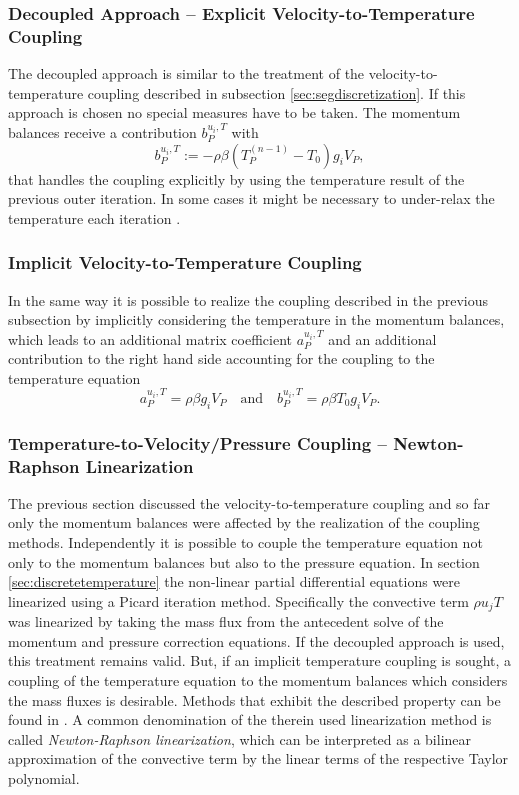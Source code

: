 \subsubsection{Decoupled Approach -- Explicit Velocity-to-Temperature Coupling}

The decoupled approach is similar to the treatment of the velocity-to-temperature coupling described in subsection \ref{sec:segdiscretization}. If this approach is chosen no special measures have to be taken. The momentum balances receive a contribution \( b_P^{u_i,T}\) with
\begin{displaymath}
  b_P^{u_i,T} := - \rho \beta \left( T_P^{(n-1)} - T_0 \right) g_i V_P,
\end{displaymath}
that handles the coupling explicitly by using the temperature result of the previous outer iteration. In some cases it might be necessary to under-relax the temperature each iteration \cite{ferziger02}.

\subsubsection{Implicit Velocity-to-Temperature Coupling}

In the same way it is possible to realize the coupling described in the previous subsection by implicitly considering the temperature in the momentum balances, which leads to an additional matrix coefficient \(a_P^{u_i,T}\) and an additional contribution to the right hand side accounting for the coupling to the temperature equation
\begin{displaymath}
  a_P^{u_i,T} = \rho \beta g_i V_P 
  \quad \text{and} \quad
  b_P^{u_i,T} = \rho \beta T_0 g_i V_P.
\end{displaymath}

\subsubsection{Temperature-to-Velocity/Pressure Coupling -- Newton-Raphson Linearization}
\label{sec:nrcoupled}

The previous section discussed the velocity-to-temperature coupling and so far only the momentum balances were affected by the realization of the coupling methods. Independently it is possible to couple the temperature equation not only to the momentum balances but also to the pressure equation. In section \ref{sec:discretetemperature} the non-linear partial differential equations were linearized using a Picard iteration method. Specifically the convective term \(\rho u_j T\) was linearized by taking the mass flux from the antecedent solve of the momentum and pressure correction equations. If the decoupled approach is used, this treatment remains valid. But, if an implicit temperature coupling is sought, a coupling of the temperature equation to the momentum balances which considers the mass fluxes is desirable. Methods that exhibit the described property can be found in \cite{galpin86,oliveira01,sheu04,vakilipour12}. A common denomination of the therein used linearization method is called \emph{Newton-Raphson linearization}, which can be interpreted as a bilinear approximation of the convective term by the linear terms of the respective Taylor polynomial.

